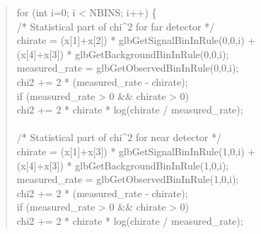 {\begin{quote}
{\hspace*{0.5 cm}      for (int i=0; i < NBINS; i++) \{                          \\
\hspace*{1.0 cm}        /* Statistical part of chi\textasciicircum2 for far detector */ \\
\hspace*{1.0 cm}        chirate = (x[1]+x[2]) * glbGetSignalBinInRule(0,0,i) +  \\
\hspace*{2.0 cm}                        (x[4]+x[3]) * glbGetBackgroundBinInRule(0,0,i);\\
\hspace*{1.0 cm}        measured\_rate = glbGetObservedBinInRule(0,0,i);        \\
\hspace*{1.0 cm}        chi2 += 2 * (measured\_rate - chirate);                 \\
\hspace*{1.0 cm}        if (measured\_rate > 0  \&\&  chirate > 0)              \\
\hspace*{1.5 cm}          chi2 += 2 * chirate * log(chirate / measured\_rate);  \\
\hspace*{1.0 cm}                                                                \\
\hspace*{1.0 cm}        /* Statistical part of chi\textasciicircum2 for near detector */ \\
\hspace*{1.0 cm}        chirate = (x[1]+x[3]) * glbGetSignalBinInRule(1,0,i) +  \\
\hspace*{2.0 cm}                        (x[4]+x[3]) * glbGetBackgroundBinInRule(1,0,i);\\
\hspace*{1.0 cm}        measured\_rate = glbGetObservedBinInRule(1,0,i);        \\
\hspace*{1.0 cm}        chi2 += 2 * (measured\_rate - chirate);                 \\
\hspace*{1.0 cm}        if (measured\_rate > 0  \&\&  chirate > 0)              \\
\hspace*{1.5 cm}          chi2 += 2 * chirate * log(chirate / measured\_rate);  \\
}
\end{quote}}
